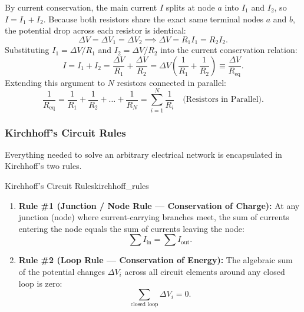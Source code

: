 By current conservation, the main current $I$ splits at node $a$ into $I_1$ and $I_2$, so $I = I_1 + I_2$. Because both resistors share the exact same terminal nodes $a$ and $b$, the potential drop across each resistor is identical:
\begin{equation}
    \Delta V = \Delta V_1 = \Delta V_2 \implies \Delta V = R_1 I_1 = R_2 I_2.
\end{equation}
Substituting $I_1 = \Delta V / R_1$ and $I_2 = \Delta V / R_2$ into the current conservation relation:
\begin{equation}
    I = I_1 + I_2 = \frac{\Delta V}{R_1} + \frac{\Delta V}{R_2} = \Delta V \left( \frac{1}{R_1} + \frac{1}{R_2} \right) \equiv \frac{\Delta V}{R_{\text{eq}}}.
\end{equation}
Extending this argument to $N$ resistors connected in parallel:
\begin{equation}
    \boxed{\frac{1}{R_{\text{eq}}} = \frac{1}{R_1} + \frac{1}{R_2} + \dots + \frac{1}{R_N} = \sum_{i=1}^N \frac{1}{R_i} \quad \text{(Resistors in Parallel)}.}
\end{equation}

\subsubsection{Kirchhoff's Circuit Rules}

Everything needed to solve an arbitrary electrical network is encapsulated in Kirchhoff's two rules.

\begin{theorem}{Kirchhoff's Circuit Rules}{kirchhoff_rules}
\begin{enumerate}
    \item \textbf{Rule \#1 (Junction / Node Rule — Conservation of Charge):} At any junction (node) where current-carrying branches meet, the sum of currents entering the node equals the sum of currents leaving the node:
    \begin{equation}
        \sum I_{\text{in}} = \sum I_{\text{out}}.
    \end{equation}
    \item \textbf{Rule \#2 (Loop Rule — Conservation of Energy):} The algebraic sum of the potential changes $\Delta V_i$ across all circuit elements around any closed loop is zero:
    \begin{equation}
        \sum_{\text{closed loop}} \Delta V_i = 0.
    \end{equation}
\end{enumerate}
\end{theorem}

